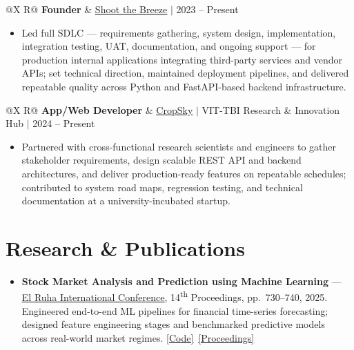 \documentclass[a4paper,10pt]{article}
\newcommand{\ulink}[2]{\href{#1}{\uline{#2}}}
\newcommand{\subheading}[1]{{\color[HTML]{0A0A0A}\fontsize{12}{14}\selectfont\bfseries #1}}
\newcommand{\meta}[1]{{\color[HTML]{5C5C5C}\fontsize{10.5}{12.5}\selectfont #1}}
\begin{document}
\begin{tabularx}{\linewidth}{@{}X R@{}}
  \subheading{Founder} &
  \meta{\ulink{https://shoot-the-breeze.vercel.app}{Shoot the Breeze} $|$ 2023 -- Present}
\end{tabularx}
\begin{itemize}[nosep, leftmargin=1.5em, itemsep=1pt, topsep=2pt]
  \item {\color[HTML]{0A0A0A}\fontsize{11}{14}\selectfont Led full SDLC --- requirements gathering, system design, implementation, integration testing, UAT, documentation, and ongoing support --- for production internal applications integrating third-party services and vendor APIs; set technical direction, maintained deployment pipelines, and delivered repeatable quality across Python and FastAPI-based backend infrastructure.}
\end{itemize}

\vspace{4pt}

\begin{tabularx}{\linewidth}{@{}X R@{}}
  \subheading{App/Web Developer} &
  \meta{\ulink{https://sites.google.com/view/cropsky/home}{CropSky} $|$ VIT-TBI Research \& Innovation Hub $|$ 2024 -- Present}
\end{tabularx}
\begin{itemize}[nosep, leftmargin=1.5em, itemsep=1pt, topsep=2pt]
  \item {\color[HTML]{0A0A0A}\fontsize{11}{14}\selectfont Partnered with cross-functional research scientists and engineers to gather stakeholder requirements, design scalable REST API and backend architectures, and deliver production-ready features on repeatable schedules; contributed to system road maps, regression testing, and technical documentation at a university-incubated startup.}
\end{itemize}

\vspace{2pt}

\section{Research \& Publications}
\vspace{2pt}

\begin{itemize}[nosep, leftmargin=1.5em, itemsep=1pt, topsep=1pt]
  \item {\color[HTML]{0A0A0A}\fontsize{11}{14}\selectfont
    \textbf{Stock Market Analysis and Prediction using Machine Learning} ---
    \ulink{https://www.elruha.org/_files/ugd/614b1f_6b95e1b697bf452b9907ba46e0151c05.pdf\#page=774}{El Ruha International Conference}, 14\textsuperscript{th} Proceedings, pp.\ 730--740, 2025.
    Engineered end-to-end ML pipelines for financial time-series forecasting; designed feature engineering stages and benchmarked predictive models across real-world market regimes.
    \ulink{https://github.com/su-jin1425/Set-Project}{[Code]}\ \ulink{https://www.elruha.org/congress-books}{[Proceedings]}
  }
\end{itemize}
\end{document}
